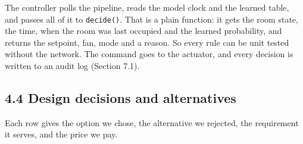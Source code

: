 \documentclass[11pt]{article}
\begin{document}
The controller polls the pipeline, reads the model clock and the learned table, and passes all of
it to \texttt{decide()}. That is a plain function: it gets the room state, the time, when the room
was last occupied and the learned probability, and returns the setpoint, fan, mode and a reason. So
every rule can be unit tested without the network. The command goes to the actuator, and every
decision is written to an audit log (Section 7.1).

\subsection{4.4 Design decisions and alternatives}

Each row gives the option we chose, the alternative we rejected, the requirement it serves, and
the price we pay.
\end{document}
